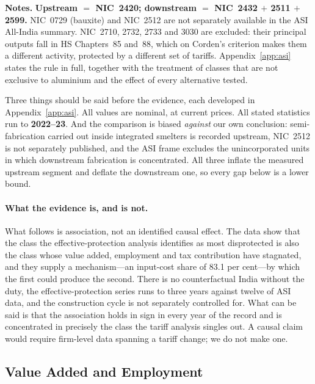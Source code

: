 \documentclass[11pt, a4paper]{article}
\numberwithin{figure}{section}
\numberwithin{table}{section}
\begin{document}
\begin{table}[H]
    \vspace{0.2cm}
    \raggedright
    \small \textbf{Notes.} \textbf{Upstream $=$ NIC~2420; downstream $=$ NIC~2432 $+$ 2511 $+$ 2599.} NIC~0729 (bauxite) and NIC~2512 are not separately available in the ASI All-India summary. NIC~2710, 2732, 2733 and 3030 are excluded: their principal outputs fall in HS Chapters~85 and~88, which on Corden's criterion makes them a different activity, protected by a different set of tariffs. Appendix~\ref{app:asi} states the rule in full, together with the treatment of classes that are not exclusive to aluminium and the effect of every alternative tested.
\end{table}

Three things should be said before the evidence, each developed in Appendix~\ref{app:asi}. All values are nominal, at current prices. All stated statistics run to \textbf{2022--23}. And the comparison is biased \emph{against} our own conclusion: semi-fabrication carried out inside integrated smelters is recorded upstream, NIC~2512 is not separately published, and the ASI frame excludes the unincorporated units in which downstream fabrication is concentrated. All three inflate the measured upstream segment and deflate the downstream one, so every gap below is a lower bound.

\paragraph{What the evidence is, and is not.} What follows is association, not an identified causal effect. The data show that the class the effective-protection analysis identifies as most disprotected is also the class whose value added, employment and tax contribution have stagnated, and they supply a mechanism---an input-cost share of 83.1 per cent---by which the first could produce the second. There is no counterfactual India without the duty, the effective-protection series runs to three years against twelve of ASI data, and the construction cycle is not separately controlled for. What can be said is that the association holds in sign in every year of the record and is concentrated in precisely the class the tariff analysis singles out. A causal claim would require firm-level data spanning a tariff change; we do not make one.

\subsection{Value Added and Employment}
\end{document}
